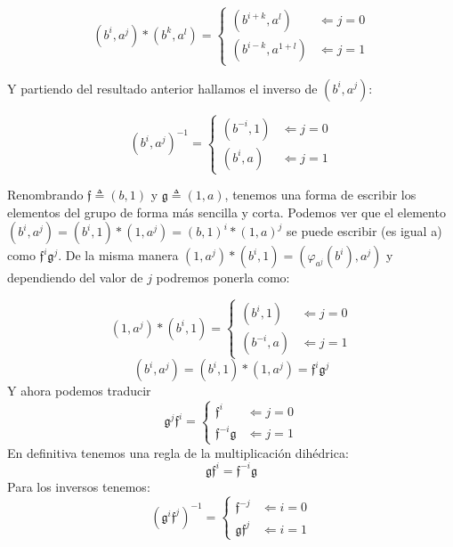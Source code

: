 \documentclass[final,12pt,a4paper,twoside,fleqn]{extbook}
\theoremstyle{definition}
\theoremstyle{remark}
\begin{document}
\[
    (b^i,a^j)*(b^k,a^l) =
    \begin{cases}
        (b^{i+k},a^{l}) &                   \Leftarrow                   j = 0 \\
        (b^{i-k},a^{1+l})&                   \Leftarrow                   j = 1
    \end{cases}
\]

Y partiendo del resultado anterior hallamos el inverso de $(b^i,a^j)$:

\[
(b^i,a^j)^{-1} =
\begin{cases}
(b^{-i},1) &                   \Leftarrow                   j = 0 \\
(b^{i},a)&                   \Leftarrow                   j = 1
\end{cases}
\]

Renombrando $\mathfrak{f}\triangleq (b,1)$ y $\mathfrak{g}\triangleq (1,a)$, tenemos una forma de escribir los elementos del grupo de forma m\'as sencilla y corta. Podemos ver que el elemento $(b^i,a^j)=(b^i,1)*(1,a^j)=(b,1)^i * (1,a)^j$ se puede escribir (es igual a) como $\mathfrak{f}^i \mathfrak{g}^j$. De la misma manera $(1,a^j)*(b^i,1)=(\varphi_{a^j}(b^i),a^j)$ y dependiendo del valor de $j$ podremos ponerla como:

\[
(1,a^j)*(b^i,1) =
\begin{cases}
(b^{i},1) &                   \Leftarrow                   j = 0 \\
(b^{-i},a)&                   \Leftarrow                   j = 1
\end{cases}
\]
\[
(b^i,a^j)=
(b^i,1)*(1,a^j)=
 \mathfrak{f}^i \mathfrak{g}^j
\]
Y ahora podemos traducir
\[
\mathfrak{g}^{j} \mathfrak{f}^{i} =
\begin{cases}
\mathfrak{f}^{i} &                   \Leftarrow                   j = 0 \\
\mathfrak{f}^{-i}\mathfrak{g}&                   \Leftarrow                   j = 1
\end{cases}
\]
En definitiva tenemos una regla de la multiplicaci\'on dih\'edrica:
\[
\mathfrak{g} \mathfrak{f}^{i} =
\mathfrak{f}^{-i}\mathfrak{g}
\]
Para los inversos tenemos:
\[
{(\mathfrak{g}^{i}\mathfrak{f}^{j})}^{-1} =
\begin{cases}
\mathfrak{f}^{-j}&                   \Leftarrow                   i = 0 \\
\mathfrak{g} \mathfrak{f}^{j}&                   \Leftarrow                   i = 1
\end{cases}
\]
\end{document}
